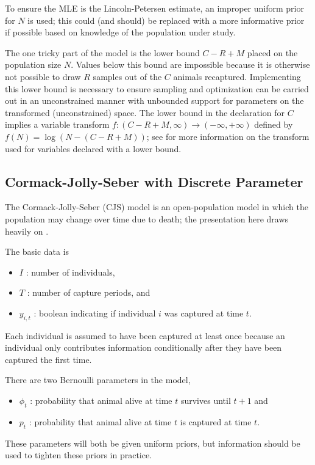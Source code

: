 To ensure the MLE is the Lincoln-Petersen estimate, an improper
uniform prior for $N$ is used; this could (and should) be replaced
with a more informative prior if possible based on knowledge of the
population under study.

The one tricky part of the model is the lower bound $C - R + M$ placed
on the population size $N$.  Values below this bound are impossible
because it is otherwise not possible to draw $R$ samples out of the
$C$ animals recaptured.  Implementing this lower bound is necessary to
ensure sampling and optimization can be carried out in an
unconstrained manner with unbounded support for parameters on the
transformed (unconstrained) space.  The lower bound in the declaration
for $C$ implies a variable transform $f : (C-R+M,\infty) \rightarrow
(-\infty,+\infty)$ defined by $f(N) = \log(N - (C - R + M))$; see
 for more information on the
transform used for variables declared with a lower bound.

\subsection{Cormack-Jolly-Seber with Discrete Parameter}

The Cormack-Jolly-Seber (CJS) model
\citep{Cormack:1964,Jolly:1965,Seber:1965} is an open-population model
in which the population may change over time due to death; the
presentation here draws heavily on \citep{Schofield:2007}.  

The basic data is
%
\begin{itemize}
\item $I$ : number of individuals, 
\item $T$ : number of capture periods, and
\item $y_{i,t}$ : boolean indicating if individual $i$ was captured at
  time $t$.
\end{itemize}
%
Each individual is assumed to have been captured at least once because
an individual only contributes information conditionally after they
have been captured the first time.

There are two Bernoulli parameters in the model,
%
\begin{itemize}
\item $\phi_t$ : probability that animal alive at time $t$ survives
  until $t + 1$ and
\item $p_t$ : probability that animal alive at time $t$ is captured at
  time $t$.
\end{itemize}
%
These parameters will both be given uniform priors, but information
should be used to tighten these priors in practice.

